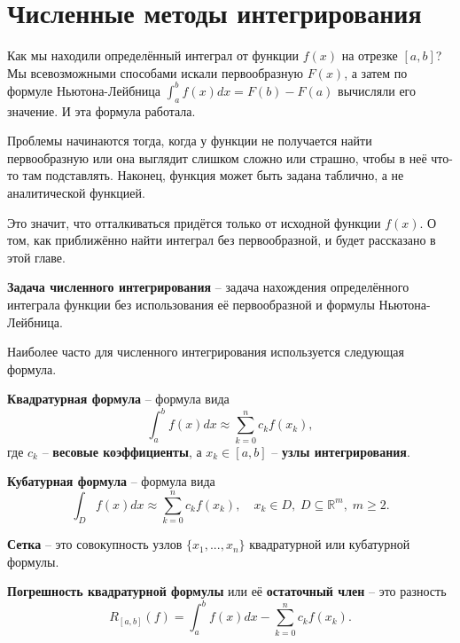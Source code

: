 \documentclass[../main.tex]{subfile}
\begin{document}
\section{Численные методы интегрирования}

Как мы находили определённый интеграл от функции $f(x)$ на отрезке $[a,b]$? Мы
всевозможными способами искали первообразную $F(x)$, а затем по формуле
Ньютона-Лейбница $\int_a^bf(x)dx=F(b)-F(a)$ вычисляли его значение. И эта
формула работала.

Проблемы начинаются тогда, когда у функции не получается найти первообразную
или она выглядит слишком сложно или страшно, чтобы в неё что-то там подставлять.
Наконец, функция может быть задана таблично, а не аналитической функцией.

Это значит, что отталкиваться придётся только от исходной функции $f(x)$. О том,
как приближённо найти интеграл без первообразной, и будет рассказано в этой главе.

\begin{define}
	\textbf{Задача численного интегрирования} -- задача нахождения
	определённого интеграла функции без использования её первообразной и
	формулы Ньютона-Лейбница.
\end{define}

Наиболее часто для численного интегрирования используется следующая формула.

\begin{define}\label{eq:quadrature_formula}
	\textbf{Квадратурная формула} -- формула вида
	\[\int_a^bf(x)dx\approx\sum_{k=0}^n c_kf(x_k),\]
	где $c_k$ -- \textbf{весовые коэффициенты}, а $x_k\in[a,b]$ --
	\textbf{узлы интегрирования}.
\end{define}

\begin{define}
	\textbf{Кубатурная формула} -- формула вида
	\[\int_{D}f(x)dx\approx\sum_{k=0}^n c_k f(x_k),\quad x_k\in D,\;D
	\subseteq\mathbb R^m,\;m\ge 2.\]
\end{define}

\begin{define}
	\textbf{Сетка} -- это совокупность узлов $\{x_1,...,x_n\}$ квадратурной
	или кубатурной формулы.
\end{define}

\begin{define}
	\textbf{Погрешность квадратурной формулы} или её \textbf{остаточный
	член} -- это разность
	\[R_{[a,b]}(f)=\int_a^b f(x)dx - \sum_{k=0}^n c_kf(x_k).\]
\end{define}
\end{document}
